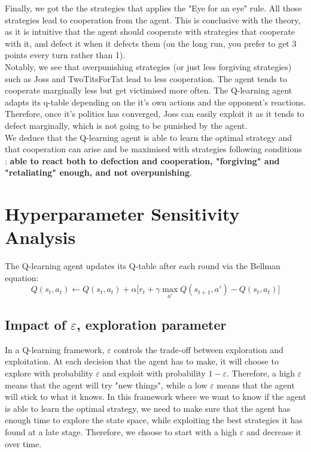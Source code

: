 \documentclass[11pt, a4paper]{article}
\begin{document}
Finally, we got the the strategies that applies the "Eye for an eye" rule. All those strategies lead to cooperation from the agent. This is conclusive with the theory, as it is intuitive that the agent should cooperate with strategies that cooperate with it, and defect it when it defects them (on the long run, you prefer to get 3 points every turn rather than 1).\\

Notably, we see that overpunishing strategies (or just less forgiving strategies) such as Joss and TwoTitsForTat lead to less cooperation. The agent tends to cooperate marginally less but get victimised more often. The Q-learning agent adapts its q-table depending on the it's own actions and the opponent's reactions. Therefore, once it's politics has converged, Joss can easily exploit it as it tends to defect marginally, which is not going to be punished by the agent. \\ 

We deduce that the Q-learning agent is able to learn the optimal strategy and that cooperation can arise and be maximised with strategies following conditions : \textbf{able to react both to defection and cooperation, "forgiving" and "retaliating" enough, and not overpunishing}. \\

\section{Hyperparameter Sensitivity Analysis}
\label{sec:hyperparams}

The Q-learning agent updates its Q-table after each round via the Bellman equation:
\[
Q(s_t, a_t) \leftarrow Q(s_t, a_t) + \alpha\bigl[r_t + \gamma \max_{a'} Q(s_{t+1}, a') - Q(s_t, a_t)\bigr]
\]
\subsection{Impact of $\varepsilon$, exploration parameter}

In a Q-learning framework, $\varepsilon$ controls the trade-off between exploration and exploitation.
At each decision that the agent has to make, it will choose to explore with probability $\varepsilon$ and exploit with probability $1-\varepsilon$.
Therefore, a high $\varepsilon$ means that the agent will try "new things", while a low $\varepsilon$ means that the agent will stick to what it knows.
In this framework where we want to know if the agent is able to learn the optimal strategy, we need to make sure that the agent has enough time to explore the state space, while exploiting the best strategies it has found at a late stage. 
Therefore, we choose to start with a high $\varepsilon$ and decrease it over time. \\
\end{document}
